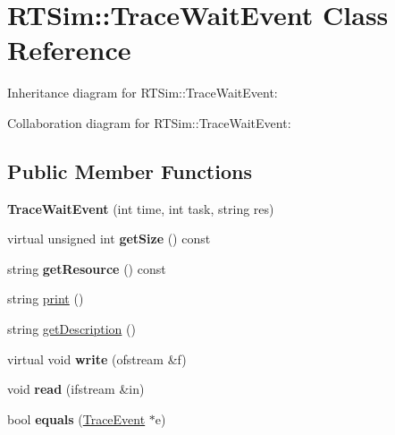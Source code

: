 \hypertarget{classRTSim_1_1TraceWaitEvent}{}\section{R\+T\+Sim\+:\+:Trace\+Wait\+Event Class Reference}
\label{classRTSim_1_1TraceWaitEvent}


Inheritance diagram for R\+T\+Sim\+:\+:Trace\+Wait\+Event\+:


Collaboration diagram for R\+T\+Sim\+:\+:Trace\+Wait\+Event\+:
\subsection*{Public Member Functions}
\begin{DoxyCompactItemize}
\item 
{\bfseries Trace\+Wait\+Event} (int time, int task, string res)\hypertarget{classRTSim_1_1TraceWaitEvent_a71aeaa9f7b400faa8920d033255a1eb7}{}\label{classRTSim_1_1TraceWaitEvent_a71aeaa9f7b400faa8920d033255a1eb7}

\item 
virtual unsigned int {\bfseries get\+Size} () const \hypertarget{classRTSim_1_1TraceWaitEvent_a8557fa2e0003a1afcb59be68208cd4b9}{}\label{classRTSim_1_1TraceWaitEvent_a8557fa2e0003a1afcb59be68208cd4b9}

\item 
string {\bfseries get\+Resource} () const \hypertarget{classRTSim_1_1TraceWaitEvent_ade2a32871f1966420d34579ffd505c9a}{}\label{classRTSim_1_1TraceWaitEvent_ade2a32871f1966420d34579ffd505c9a}

\item 
string \hyperlink{classRTSim_1_1TraceWaitEvent_a4671e4696498a49f0a46eb7fb741aca7}{print} ()
\item 
string \hyperlink{classRTSim_1_1TraceWaitEvent_a826d6cbfc6e4ec4ccf88adb1b0bb8f29}{get\+Description} ()
\item 
virtual void {\bfseries write} (ofstream \&f)\hypertarget{classRTSim_1_1TraceWaitEvent_a338942fc4c85b31d18523eeac4d19edb}{}\label{classRTSim_1_1TraceWaitEvent_a338942fc4c85b31d18523eeac4d19edb}

\item 
void {\bfseries read} (ifstream \&in)\hypertarget{classRTSim_1_1TraceWaitEvent_a9720b91983cd2582769a502f4ffa2924}{}\label{classRTSim_1_1TraceWaitEvent_a9720b91983cd2582769a502f4ffa2924}

\item 
bool {\bfseries equals} (\hyperlink{classRTSim_1_1TraceEvent}{Trace\+Event} $\ast$e)\hypertarget{classRTSim_1_1TraceWaitEvent_aa3e4f473ef330038c24bd748c6a5cdcb}{}\label{classRTSim_1_1TraceWaitEvent_aa3e4f473ef330038c24bd748c6a5cdcb}

\end{DoxyCompactItemize}
